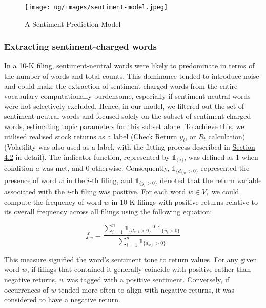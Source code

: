 \documentclass[logo,bsc,singlespacing,parskip]{infthesis}
\begin{document}
\begin{figure}[h!]
    \centering
    \texttt{[image: ug/images/sentiment-model.jpeg]}
    \caption{A Sentiment Prediction Model}
    \label{fig:sentiment-model}
\end{figure}

\subsubsection{Extracting sentiment-charged words}
In a 10-K filing, sentiment-neutral words were likely to predominate in terms of the number of words and total counts. This dominance tended to introduce noise and could make the extraction of sentiment-charged words from the entire vocabulary computationally burdensome, especially if sentiment-neutral words were not selectively excluded. Hence, in our model, we filtered out the set of sentiment-neutral words and focused solely on the subset of sentiment-charged words, estimating topic parameters for this subset alone. To achieve this, we utilised realised stock returns as a label (Check \hyperref[subsubsubsec:return_calculation]{Return $y_i$, or $R_t$ calculation}) (Volatility was also used as a label, with the fitting process described in \hyperref[sec:volatility_label]{Section 4.2} in detail). The indicator function, represented by $\mathbb{1}_{\{a\}}$, was defined as 1 when condition $a$ was met, and 0 otherwise. Consequently, $\mathbb{1}_{\{d_{i,w} > 0\}}$ represented the presence of word $w$ in the $i$-th filing, and $\mathbb{1}_{\{y_i > 0\}}
$ denoted that the return variable associated with the $i$-th filing was positive. For each word $w \in V,$ we could compute the frequency of word $w$ in 10-K filings with positive returns relative to its overall frequency across all filings using the following equation: 

\begin{equation} \label{4.2}
f_w = \frac{\sum_{i=1}^{n} \mathbb{1}_{\{d_{w,i}>0\}} * \mathbb{1}_{\{y_i>0\}}}{\sum_{i=1}^{n} \mathbb{1}_{\{d_{w,i}>0\}}}
\end{equation}

This measure signified the word’s sentiment tone to return values. For any given word $w$, if filings that contained it generally coincide with positive rather than negative returns, $w$ was tagged with a positive sentiment. Conversely, if occurrences of $w$ tended more often to align with negative returns, it was considered to have a negative return. 
\end{document}
